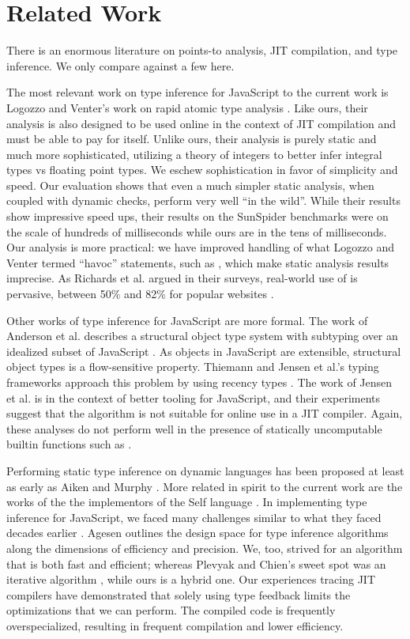 \section{Related Work}
\label{sec:related-work}

There is an enormous literature on points-to analysis, JIT compilation, and
type inference. We only compare against a few here.

The most relevant work on type inference for JavaScript to the current work is
Logozzo and Venter's work on rapid atomic type analysis \cite{Logozzo10}.
Like ours, their analysis is also designed to be used online in the context of
JIT compilation and must be able to pay for itself. Unlike ours, their
analysis is purely static and much more sophisticated, utilizing a theory of
integers to better infer integral types vs floating point types. We eschew
sophistication in favor of simplicity and speed. Our evaluation shows that
even a much simpler static analysis, when coupled with dynamic checks, perform
very well ``in the wild''. While their results show impressive speed ups,
their results on the SunSpider benchmarks were on the scale of hundreds of
milliseconds while ours are in the tens of milliseconds. Our analysis is more
practical: we have improved handling of what Logozzo and Venter termed ``havoc''
statements, such as , which make static analysis results
imprecise. As Richards et al. argued in their surveys, real-world use of
 is pervasive, between 50\% and 82\% for popular websites
\cite{Richards11, Richards10}.

Other works of type inference for JavaScript are more formal. The work of
Anderson et al. describes a structural object type system with subtyping over
an idealized subset of JavaScript \cite{Anderson05}. As objects in JavaScript
are extensible, structural object types is a flow-sensitive property. Thiemann
and Jensen et al.'s typing frameworks approach this problem by using recency
types \cite{Thiemann05, Jensen09}. The work of Jensen et al. is in the context
of better tooling for JavaScript, and their experiments suggest that the
algorithm is not suitable for online use in a JIT compiler. Again, these
analyses do not perform well in the presence of statically uncomputable
builtin functions such as .

Performing static type inference on dynamic languages has been proposed at
least as early as Aiken and Murphy \cite{Aiken91}. More related in spirit to
the current work are the works of the the implementors of the Self language
\cite{Ungar87}. In implementing type inference for JavaScript, we faced many
challenges similar to what they faced decades earlier \cite{Ungar92,
  Agesen94}. Agesen outlines the design space for type inference algorithms
along the dimensions of efficiency and precision. We, too, strived for an
algorithm that is both fast and efficient; whereas Plevyak and Chien's
sweet spot was an iterative algorithm \cite{Plevyak93}, while ours is a
hybrid one. Our experiences tracing JIT compilers \cite{GalVEE09, GalPLDI09} have
demonstrated that solely using type feedback limits the optimizations that we
can perform. The compiled code is frequently overspecialized, resulting
in frequent compilation and lower efficiency.

